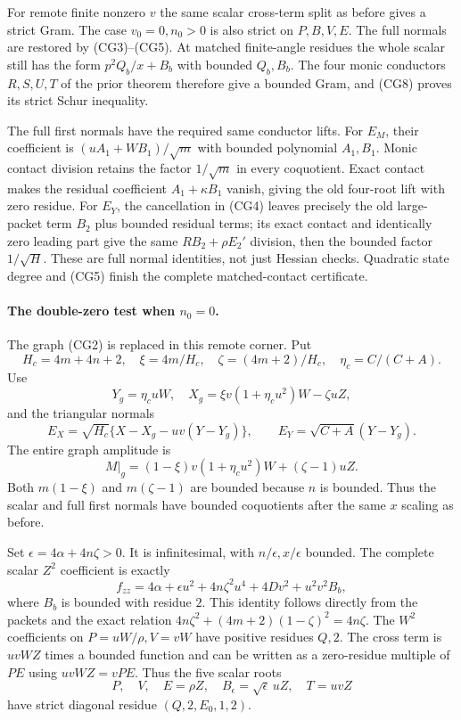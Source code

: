 For remote finite nonzero $v$ the same scalar cross-term split as
before gives a strict Gram.  The case $v_0=0,n_0>0$ is also strict
on $P,B,V,E$.  The full normals are restored by (CG3)--(CG5).
At matched finite-angle residues the whole scalar still has the
form $p^2Q_b/x+B_b$ with bounded $Q_b,B_b$.  The four monic
conductors $R,S,U,T$ of the prior theorem therefore give a bounded
Gram, and (CG8) proves its strict Schur inequality.

The full first normals have the required same conductor lifts.
For $E_M$, their coefficient is $(uA_1+WB_1)/\sqrt m$ with bounded
polynomial $A_1,B_1$.  Monic contact division retains the factor
$1/\sqrt m$ in every coquotient.  Exact contact makes the residual
coefficient $A_1+\kappa B_1$ vanish, giving the old four-root lift
with zero residue.  For $E_Y$, the cancellation in (CG4) leaves
precisely the old large-packet term $B_2$ plus bounded residual
terms; its exact contact and identically zero leading part give
the same $R B_2+\rho E_2'$ division, then the bounded factor
$1/\sqrt H$.  These are full normal identities, not just Hessian
checks.  Quadratic state degree and (CG5) finish the complete
matched-contact certificate.

\paragraph{The double-zero test when $n_0=0$.}
The graph (CG2) is replaced in this remote corner.  Put
\[
 H_c=4m+4n+2,\quad \xi=4m/H_c,\quad
 \zeta=(4m+2)/H_c,\quad \eta_c=C/(C+A).
\]
Use
\[
 Y_g=\eta_cuW,\quad
 X_g=\xi v(1+\eta_cu^2)W-\zeta uZ,
\]
and the triangular normals
\[
 E_X=\sqrt{H_c}\{X-X_g-uv(Y-Y_g)\},\qquad
 E_Y=\sqrt{C+A}(Y-Y_g).                                \tag{CG9}
\]
The entire graph amplitude is
\[
 M|_g=(1-\xi)v(1+\eta_cu^2)W+(\zeta-1)uZ.
\]
Both $m(1-\xi)$ and $m(\zeta-1)$ are bounded because $n$ is
bounded.  Thus the scalar and full first normals have bounded
coquotients after the same $x$ scaling as before.

Set $\epsilon=4\alpha+4n\zeta>0$.  It is infinitesimal, with
$n/\epsilon,x/\epsilon$ bounded.  The complete scalar $Z^2$
coefficient is exactly
\[
 f_{zz}=4\alpha+\epsilon u^2+4n\zeta^2u^4+4Dv^2
                            +u^2v^2 B_b,               \tag{CG10}
\]
where $B_b$ is bounded with residue $2$.  This identity follows
directly from the packets and the exact relation
$4n\zeta^2+(4m+2)(1-\zeta)^2=4n\zeta$.
The $W^2$ coefficients on $P=uW/\rho,V=vW$ have positive residues
$Q,2$.  The cross term is $uvWZ$ times a bounded function and
can be written as a zero-residue multiple of $PE$ using
$uvWZ=vPE$.  Thus the five scalar roots
\[
           P,\quad V,\quad E=\rho Z,\quad
           B_\epsilon=\sqrt\epsilon\,uZ,\quad T=uvZ
\]
have strict diagonal residue $(Q,2,E_0,1,2)$.

